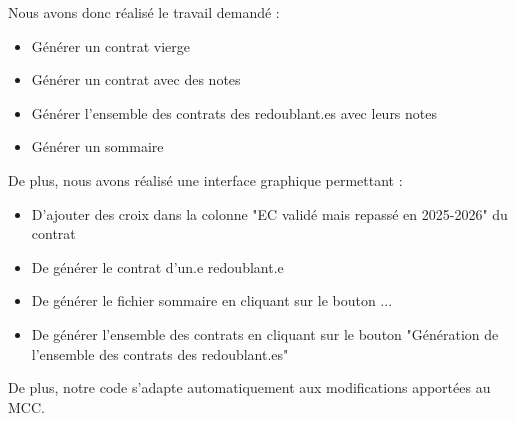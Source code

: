 Nous avons donc réalisé le travail demandé :
\begin{itemize}
    \item Générer un contrat vierge
    \item Générer un contrat avec des notes
    \item Générer l'ensemble des contrats des redoublant.es avec leurs notes
    \item Générer un sommaire
\end{itemize}


De plus, nous avons réalisé une interface graphique permettant : 
\begin{itemize}
  \item D'ajouter des croix dans la colonne "EC validé mais repassé en 2025-2026" du contrat
  \item De générer le contrat d'un.e redoublant.e
  \item De générer le fichier sommaire en cliquant sur le bouton ...
  \item De générer l'ensemble des contrats en cliquant sur le bouton "Génération de l'ensemble des contrats des redoublant.es"
\end{itemize}


De plus, notre code s'adapte automatiquement aux modifications apportées au MCC.